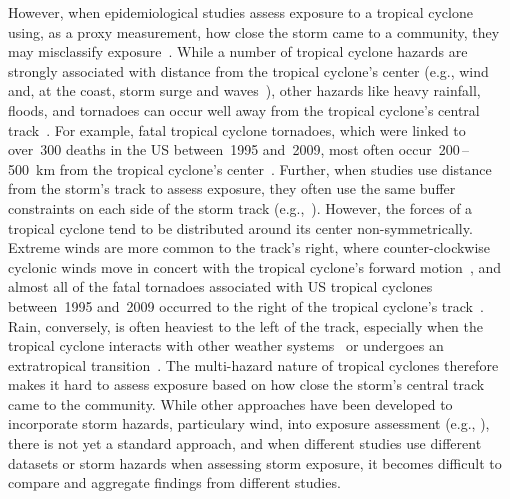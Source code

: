 However, when epidemiological studies assess exposure to a tropical cyclone
using, as a proxy measurement, how close the storm came to a community, they
may misclassify exposure~\parencite{grabich2015measuring}. While a number of
tropical cyclone hazards are strongly associated with distance from the
tropical cyclone's center (e.g., wind and, at the coast, storm surge and
waves~\parencite{rappaport2000, kruk2010}), other hazards like heavy rainfall,
floods, and tornadoes can occur well away from the tropical cyclone's central
track~\parencite{rappaport2000, atallah2007, moore2012}.  For example, fatal
tropical cyclone tornadoes, which were linked to over~300 deaths in the \ac{US}
between~1995 and~2009, most often occur~200\,--\,500~\si{\kilo\metre} from the
tropical cyclone's center~\parencite{moore2012}.  Further, when studies use
distance from the storm's track to assess exposure, they often use the same
buffer constraints on each side of the storm track
(e.g.,~\cite{kinney2008, currie2013}).  However, the forces of a tropical
cyclone tend to be distributed around its center non-symmetrically.  Extreme
winds are more common to the track's right, where counter-clockwise cyclonic
winds move in concert with the tropical cyclone's forward
motion~\parencite{halverson2015}, and almost all of the fatal tornadoes
associated with \ac{US} tropical cyclones between~1995 and~2009 occurred to the
right of the tropical cyclone's track~\parencite{moore2012}. Rain, conversely,
is often heaviest to the left of the track, especially when the tropical
cyclone interacts with other weather systems~\parencite{atallah2003,
atallah2007, zhu2013variations} or undergoes an extratropical
transition~\parencite{elsberry2002}.  The multi-hazard nature of tropical
cyclones therefore makes it hard to assess exposure based on how close the
storm's central track came to the community.  While other approaches have been
developed to incorporate storm hazards, particulary wind, into exposure
assessment (e.g., \cite{grabich2015measuring, zandbergen2009, czajkowski2011}),
there is not yet a standard approach, and when different studies use different
datasets or storm hazards when assessing storm exposure, it becomes difficult
to compare and aggregate findings from different studies. 


